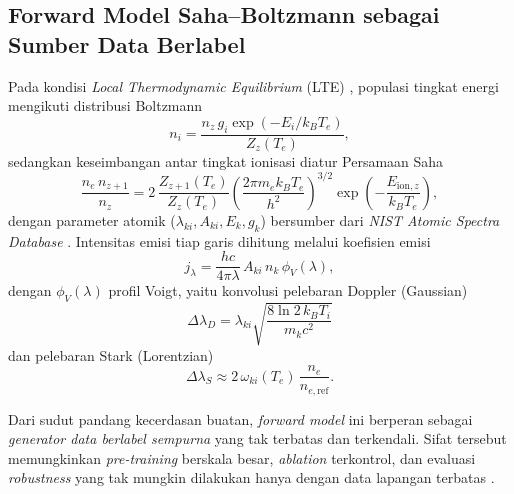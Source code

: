 \subsection{Forward Model Saha--Boltzmann sebagai Sumber Data Berlabel}

Pada kondisi \textit{Local Thermodynamic Equilibrium} (LTE) \citep{cristoforetti_local_2010}, populasi tingkat energi mengikuti distribusi Boltzmann
\begin{equation} \label{eq:bab2ai_boltzmann}
n_i = \frac{n_z \, g_i \exp(-E_i / k_B T_e)}{Z_z(T_e)},
\end{equation}
sedangkan keseimbangan antar tingkat ionisasi diatur Persamaan Saha
\begin{equation} \label{eq:bab2ai_saha}
\frac{n_e \, n_{z+1}}{n_z} = 2\,\frac{Z_{z+1}(T_e)}{Z_z(T_e)} \left(\frac{2\pi m_e k_B T_e}{h^2}\right)^{3/2} \exp\!\left(-\frac{E_{\mathrm{ion},z}}{k_B T_e}\right),
\end{equation}
dengan parameter atomik ($\lambda_{ki}, A_{ki}, E_k, g_k$) bersumber dari \textit{NIST Atomic Spectra Database} \citep{sawyers_database_2025}. Intensitas emisi tiap garis dihitung melalui koefisien emisi
\begin{equation} \label{eq:bab2ai_emiss}
j_\lambda = \frac{hc}{4\pi\lambda}\,A_{ki}\,n_k\,\phi_V(\lambda),
\end{equation}
dengan $\phi_V(\lambda)$ profil Voigt, yaitu konvolusi pelebaran Doppler (Gaussian)
\begin{equation} \label{eq:bab2ai_doppler}
\Delta\lambda_D = \lambda_{ki}\sqrt{\frac{8\ln 2\,k_B T_i}{m_k c^2}}
\end{equation}
dan pelebaran Stark (Lorentzian)
\begin{equation} \label{eq:bab2ai_stark}
\Delta\lambda_S \approx 2\,\omega_{ki}(T_e)\,\frac{n_e}{n_{e,\mathrm{ref}}} .
\end{equation}

Dari sudut pandang kecerdasan buatan, \textit{forward model} ini berperan sebagai \emph{generator data berlabel sempurna} yang tak terbatas dan terkendali. Sifat tersebut memungkinkan \textit{pre-training} berskala besar, \textit{ablation} terkontrol, dan evaluasi \textit{robustness} yang tak mungkin dilakukan hanya dengan data lapangan terbatas \citep{favre_towards_2025}.

